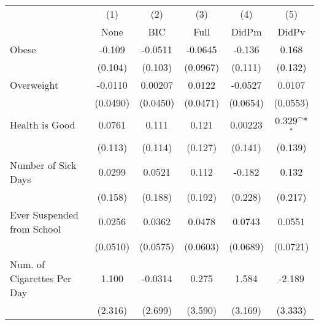 {
\def\sym#1{\ifmmode^{#1}\else\(^{#1}\)\fi}
\begin{tabular}{l*{5}{c}}
\toprule
            &\multicolumn{1}{c}{(1)}&\multicolumn{1}{c}{(2)}&\multicolumn{1}{c}{(3)}&\multicolumn{1}{c}{(4)}&\multicolumn{1}{c}{(5)}\\
            &\multicolumn{1}{c}{None}&\multicolumn{1}{c}{BIC}&\multicolumn{1}{c}{Full}&\multicolumn{1}{c}{DidPm}&\multicolumn{1}{c}{DidPv}\\
\midrule
Obese       &      -0.109         &     -0.0511         &     -0.0645         &      -0.136         &       0.168         \\
            &     (0.104)         &     (0.103)         &    (0.0967)         &     (0.111)         &     (0.132)         \\
\addlinespace
Overweight  &     -0.0110         &     0.00207         &      0.0122         &     -0.0527         &      0.0107         \\
            &    (0.0490)         &    (0.0450)         &    (0.0471)         &    (0.0654)         &    (0.0553)         \\
\addlinespace
Health is Good&      0.0761         &       0.111         &       0.121         &     0.00223         &       0.329\sym{*}  \\
            &     (0.113)         &     (0.114)         &     (0.127)         &     (0.141)         &     (0.139)         \\
\addlinespace
Number of Sick Days&      0.0299         &      0.0521         &       0.112         &      -0.182         &       0.132         \\
            &     (0.158)         &     (0.188)         &     (0.192)         &     (0.228)         &     (0.217)         \\
\addlinespace
Ever Suspended from School&      0.0256         &      0.0362         &      0.0478         &      0.0743         &      0.0551         \\
            &    (0.0510)         &    (0.0575)         &    (0.0603)         &    (0.0689)         &    (0.0721)         \\
\addlinespace
Num. of Cigarettes Per Day&       1.100         &     -0.0314         &       0.275         &       1.584         &      -2.189         \\
            &     (2.316)         &     (2.699)         &     (3.590)         &     (3.169)         &     (3.333)         \\
\bottomrule
\end{tabular}
}
